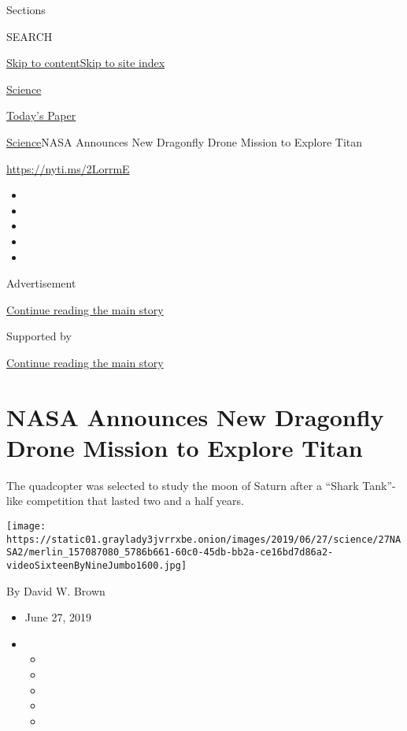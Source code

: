 Sections

SEARCH

\protect\hyperlink{site-content}{Skip to
content}\protect\hyperlink{site-index}{Skip to site index}

\href{https://www.nytimes3xbfgragh.onion/section/science}{Science}

\href{https://myaccount.nytimes3xbfgragh.onion/auth/login?response_type=cookie\&client_id=vi}{}

\href{https://www.nytimes3xbfgragh.onion/section/todayspaper}{Today's
Paper}

\href{/section/science}{Science}\textbar{}NASA Announces New Dragonfly
Drone Mission to Explore Titan

\url{https://nyti.ms/2LorrmE}

\begin{itemize}
\item
\item
\item
\item
\item
\end{itemize}

Advertisement

\protect\hyperlink{after-top}{Continue reading the main story}

Supported by

\protect\hyperlink{after-sponsor}{Continue reading the main story}

\hypertarget{nasa-announces-new-dragonfly-drone-mission-to-explore-titan}{%
\section{NASA Announces New Dragonfly Drone Mission to Explore
Titan}\label{nasa-announces-new-dragonfly-drone-mission-to-explore-titan}}

The quadcopter was selected to study the moon of Saturn after a ``Shark
Tank''-like competition that lasted two and a half years.

\texttt{[image: https://static01.graylady3jvrrxbe.onion/images/2019/06/27/science/27NASA2/merlin\_157087080\_5786b661-60c0-45db-bb2a-ce16bd7d86a2-videoSixteenByNineJumbo1600.jpg]}

By David W. Brown

\begin{itemize}
\item
  June 27, 2019
\item
  \begin{itemize}
  \item
  \item
  \item
  \item
  \item
  \end{itemize}
\end{itemize}

